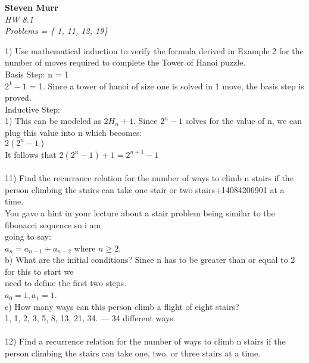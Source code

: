\documentclass{article}
\begin{document}
\setcounter{totalnumber}{5}
   \begin{flushright}
      \Large\textbf{Steven Murr}\\
      \large\textit{HW 8.1} \\
      \large\textit{ Problems =  \{ 1, 11, 12, 19\} }
   \end{flushright}
\begin{flushleft}
\makeatletter%
\setlength{\@fptop}{5pt}
\makeatother

\setlength\parindent{0pt}1) Use mathematical induction to verify the formula derived in Example 2 for the number of moves required to complete the Tower of Hanoi puzzle.\\
Basis Step: n = 1 \\
$2^1 - 1$ = 1.  Since a tower of hanoi of size one is solved in 1 move, the basis step is proved. \\
Inductive Step:\\
1) This can be modeled as $2H_n +1$.  
Since $2^n-1$ solves for the value of n, we can plug this value into n which becomes: \\
$2(2^n-1)$ \\
It follows that $2(2^{n}-1) +1 = 2^{n+1}-1$ \\
~\\
\setlength\parindent{0pt}11) Find the recurrance relation for the number of ways to climb n stairs if the person climbing the stairs can take one stair or two stairs+14084206901 at a time. \\
\setlength\parindent{24pt} You gave a hint in your lecture about a stair problem being similar to the fibonacci sequence so i am \\going to say: \\
\setlength\parindent{48pt} $a_n = a_{n-1} + a_{n-2} $ where $n \geq 2$. \\
\setlength\parindent{24pt}b) What are the initial conditions?  Since n has to be greater than or equal to 2 for this to start we \\need to define the first two steps.  \\
\setlength\parindent{24pt}$a_0 = 1, a_1 = 1$. \\
\setlength\parindent{24pt}c) How many ways can this person climb a flight of eight stairs? \\
\setlength\parindent{24pt}1, 1, 2, 3, 5, 8, 13, 21, 34.  --- 34 different ways. \\
~\\
\setlength\parindent{0pt}12) Find a recurrence relation for the number of ways to climb n stairs if the person climbing the stairs can take one, two, or three stairs at a time. \\ 

\end{flushleft}
\end{document}
